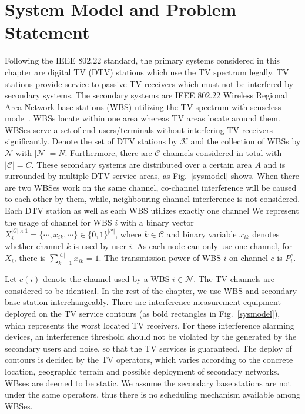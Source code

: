 \section{System Model and Problem Statement}
\label{SystemModel}
Following the IEEE 802.22 standard, the primary systems considered in this chapter are digital TV (DTV) stations which use the TV spectrum legally. 
TV stations provide service to passive TV receivers which must not be interfered by secondary systems. 
The secondary systems are IEEE 802.22 Wireless Regional Area Network base stations (WBS) utilizing the TV spectrum with senseless mode~\cite{SenseLess2011}. 
WBSs locate within one area whereas TV areas locate around them. 
WBSes serve a set of end users/terminals without interfering TV receivers significantly.
Denote the set of DTV stations by $\mathcal{K}$ and the collection of WBSs by $\mathcal{N}$ with $| \mathcal{N}|=N$. 
Furthermore, there are $\mathcal{C}$ channels considered in total with $|\mathcal{C}| = C$. 
These secondary systems are distributed over a certain area $A$ and is surrounded by multiple DTV service areas, as Fig.~\ref{sysmodel} shows. 
When there are two WBSes work on the same channel, co-channel interference will be caused to each other by them, while, neighbouring channel interference is not considered. Each DTV station as well as each WBS utilizes exactly one channel 
We represent the usage of channel for WBS $i$ with a binary vector $X_i^{|\mathcal{C}|\times 1}=\{\cdots, x_{ik}, \cdots\}\in \{0,1\}^{|\mathcal{C}|}$, where $k\in \mathcal{C}$ and binary variable $x_{ik}$ denotes whether channel $k$ is used by user $i$. As each node can only use one channel, for $X_i$, there is $\sum_{k=1}^{|\mathcal{C}|}x_{ik}=1$. 
The transmission power of WBS $i$ on channel $c$ is $P_i^c$. 

Let $c(i)$ denote the channel used by a WBS $i\in \mathcal{N}$. 
The TV channels are considered to be identical. 
In the rest of the chapter, we use WBS and secondary base station interchangeably. 
There are interference measurement equipment deployed on the TV service contours (as bold rectangles in Fig.~\ref{sysmodel}), which represents the worst located TV receivers. 
For these interference alarming devices, an interference threshold should not be violated by the generated by the secondary users and noise, so that the TV services is guaranteed.
The deploy of contours is decided by the TV operators, which varies according to the concrete location, geographic terrain and possible deployment of secondary networks. 
WBses are deemed to be static.
We assume the secondary base stations are not under the same operators, thus there is no scheduling mechanism available among WBSes.




